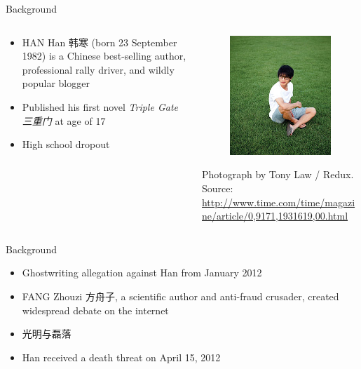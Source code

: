 \documentclass[12pt, trans]{beamer}
\newcommand{\1}[1]{{\mathbf 1}\left\{#1\right\}}        %
\begin{document}
\begin{frame}{Background}

\note{

}

 \begin{columns}[t]
 \begin{column}{0.6\textwidth}

\begin{itemize}[<+->]
\item  HAN Han 韩寒 (born 23 September 1982) is a Chinese best-selling author, professional rally driver, and  wildly  popular blogger
\item Published his first novel {\em Triple Gate 三重门} at age of 17
\item High school dropout
\end{itemize}

 \end{column}
 \begin{column}{0.45\textwidth}
\begin{figure}
  \centering
  \includegraphics[scale=0.4]{han_han.jpg} 
\end{figure}
{\tiny Photograph by Tony Law / Redux. Source: \url{http://www.time.com/time/magazine/article/0,9171,1931619,00.html}}
 \end{column}
 \end{columns}

\end{frame}



\begin{frame}{Background}

\begin{itemize}[<+->]
\item Ghostwriting allegation against Han from January 2012
\item FANG Zhouzi 方舟子, a scientific author and anti-fraud crusader, created widespread debate on the internet
\item 光明与磊落
\item Han received a death threat on April 15, 2012
\end{itemize}

\end{frame}
\end{document}
